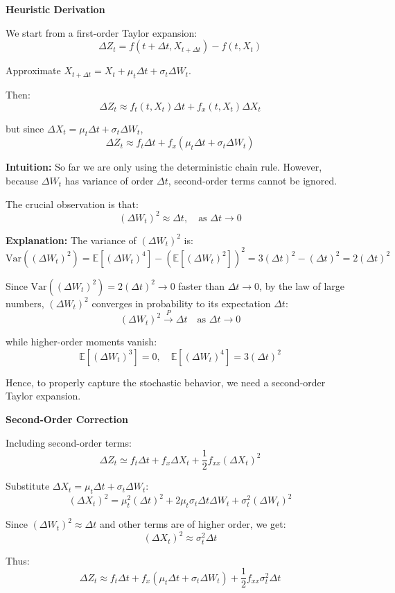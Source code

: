 \documentclass[12pt,a4paper]{article}
\theoremstyle{definition}
\begin{document}
\textbf{Heuristic Derivation}

We start from a first-order Taylor expansion:
\[
\Delta Z_t = f(t + \Delta t, X_{t+\Delta t}) - f(t, X_t)
\]

Approximate $X_{t+\Delta t} = X_t + \mu_t \Delta t + \sigma_t \Delta W_t$.

Then:
\[
\Delta Z_t \approx f_t(t, X_t) \Delta t + f_x(t, X_t) \Delta X_t
\]

but since $\Delta X_t = \mu_t \Delta t + \sigma_t \Delta W_t$,
\[
\Delta Z_t \approx f_t \Delta t + f_x(\mu_t \Delta t + \sigma_t \Delta W_t)
\]

\textbf{Intuition:} So far we are only using the deterministic chain rule. However, because $\Delta W_t$ has variance of order $\Delta t$, second-order terms cannot be ignored.

The crucial observation is that:
\[
(\Delta W_t)^2 \approx \Delta t, \quad \text{as } \Delta t \to 0
\]

\textbf{Explanation:} The variance of $(\Delta W_t)^2$ is:
\[
\text{Var}((\Delta W_t)^2) = \mathbb{E}[(\Delta W_t)^4] - (\mathbb{E}[(\Delta W_t)^2])^2 = 3(\Delta t)^2 - (\Delta t)^2 = 2(\Delta t)^2
\]

Since $\text{Var}((\Delta W_t)^2) = 2(\Delta t)^2 \to 0$ faster than $\Delta t \to 0$, by the law of large numbers, $(\Delta W_t)^2$ converges in probability to its expectation $\Delta t$:
\[
(\Delta W_t)^2 \xrightarrow{P} \Delta t \quad \text{as } \Delta t \to 0
\]

while higher-order moments vanish:
\[
\mathbb{E}[(\Delta W_t)^3] = 0, \quad \mathbb{E}[(\Delta W_t)^4] = 3(\Delta t)^2
\]

Hence, to properly capture the stochastic behavior, we need a second-order Taylor expansion.

\textbf{Second-Order Correction}

Including second-order terms:
\[
\Delta Z_t \simeq f_t \Delta t + f_x \Delta X_t + \frac{1}{2} f_{xx} (\Delta X_t)^2
\]

Substitute $\Delta X_t = \mu_t \Delta t + \sigma_t \Delta W_t$:
\[
(\Delta X_t)^2 = \mu_t^2 (\Delta t)^2 + 2\mu_t \sigma_t \Delta t \Delta W_t + \sigma_t^2 (\Delta W_t)^2
\]

Since $(\Delta W_t)^2 \approx \Delta t$ and other terms are of higher order, we get:
\[
(\Delta X_t)^2 \approx \sigma_t^2 \Delta t
\]

Thus:
\[
\Delta Z_t \approx f_t \Delta t + f_x(\mu_t \Delta t + \sigma_t \Delta W_t) + \frac{1}{2} f_{xx} \sigma_t^2 \Delta t
\]
\end{document}
